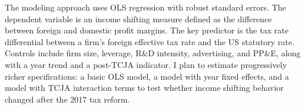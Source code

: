 \documentclass[12pt]{article}
\begin{document}
The modeling approach uses OLS regression with robust standard errors. The dependent variable is an income shifting measure defined as the difference between foreign and domestic profit margins. The key predictor is the tax rate differential between a firm's foreign effective tax rate and the US statutory rate. Controls include firm size, leverage, R\&D intensity, advertising, and PP\&E, along with a year trend and a post-TCJA indicator. I plan to estimate progressively richer specifications: a basic OLS model, a model with year fixed effects, and a model with TCJA interaction terms to test whether income shifting behavior changed after the 2017 tax reform.
\end{document}
